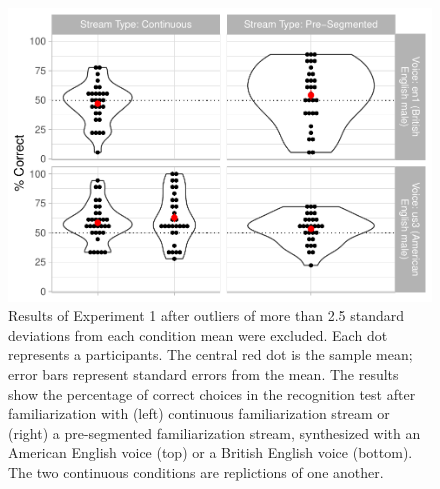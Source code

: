 \documentclass[
]{article}
\begin{document}
\begin{figure}

{\centering \includegraphics[width=0.8\linewidth]{segmentation_recall_combined_for_revision2_files/figure-latex/stats-london-stats.3x.us.en.segm.cont.combined.plot-no-outliers-1} 

}

\caption{Results of Experiment 1 after outliers of more than 2.5 standard deviations from each condition mean were excluded. Each dot represents a participants. The central red dot is the sample mean; error bars represent standard errors from the mean. The results show the percentage of correct choices in the recognition test after familiarization with (left) continuous familiarization stream or (right) a pre-segmented familiarization stream, synthesized with an American English voice (top) or a British English voice (bottom). The two continuous conditions are replictions of one another.}\label{fig:stats-london-stats.3x.us.en.segm.cont.combined.plot-no-outliers}
\end{figure}
\end{document}
